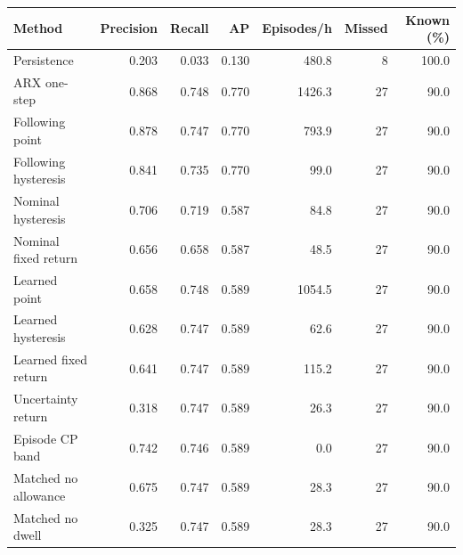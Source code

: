\begin{tabular}{lrrrrrr}\toprule
Method & Precision & Recall & AP & Episodes/h & Missed & Known (\%) \\\midrule
Persistence & 0.203 & 0.033 & 0.130 & 480.8 & 8 & 100.0 \\
ARX one-step & 0.868 & 0.748 & 0.770 & 1426.3 & 27 & 90.0 \\
Following point & 0.878 & 0.747 & 0.770 & 793.9 & 27 & 90.0 \\
Following hysteresis & 0.841 & 0.735 & 0.770 & 99.0 & 27 & 90.0 \\
Nominal hysteresis & 0.706 & 0.719 & 0.587 & 84.8 & 27 & 90.0 \\
Nominal fixed return & 0.656 & 0.658 & 0.587 & 48.5 & 27 & 90.0 \\
Learned point & 0.658 & 0.748 & 0.589 & 1054.5 & 27 & 90.0 \\
Learned hysteresis & 0.628 & 0.747 & 0.589 & 62.6 & 27 & 90.0 \\
Learned fixed return & 0.641 & 0.747 & 0.589 & 115.2 & 27 & 90.0 \\
Uncertainty return & 0.318 & 0.747 & 0.589 & 26.3 & 27 & 90.0 \\
Episode CP band & 0.742 & 0.746 & 0.589 & 0.0 & 27 & 90.0 \\
Matched no allowance & 0.675 & 0.747 & 0.589 & 28.3 & 27 & 90.0 \\
Matched no dwell & 0.325 & 0.747 & 0.589 & 28.3 & 27 & 90.0 \\
\bottomrule\end{tabular}
